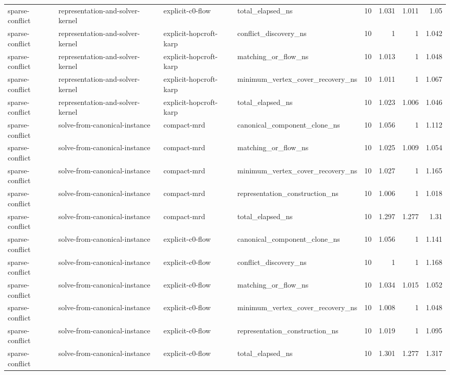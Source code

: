 \begin{table}[t]
\begin{tabular}{llllrrrr}
sparse-conflict & representation-and-solver-kernel & explicit-c0-flow & total\_elapsed\_ns & 10 & 1.031 & 1.011 & 1.05 \\
sparse-conflict & representation-and-solver-kernel & explicit-hopcroft-karp & conflict\_discovery\_ns & 10 & 1 & 1 & 1.042 \\
sparse-conflict & representation-and-solver-kernel & explicit-hopcroft-karp & matching\_or\_flow\_ns & 10 & 1.013 & 1 & 1.048 \\
sparse-conflict & representation-and-solver-kernel & explicit-hopcroft-karp & minimum\_vertex\_cover\_recovery\_ns & 10 & 1.011 & 1 & 1.067 \\
sparse-conflict & representation-and-solver-kernel & explicit-hopcroft-karp & total\_elapsed\_ns & 10 & 1.023 & 1.006 & 1.046 \\
sparse-conflict & solve-from-canonical-instance & compact-mrd & canonical\_component\_clone\_ns & 10 & 1.056 & 1 & 1.112 \\
sparse-conflict & solve-from-canonical-instance & compact-mrd & matching\_or\_flow\_ns & 10 & 1.025 & 1.009 & 1.054 \\
sparse-conflict & solve-from-canonical-instance & compact-mrd & minimum\_vertex\_cover\_recovery\_ns & 10 & 1.027 & 1 & 1.165 \\
sparse-conflict & solve-from-canonical-instance & compact-mrd & representation\_construction\_ns & 10 & 1.006 & 1 & 1.018 \\
sparse-conflict & solve-from-canonical-instance & compact-mrd & total\_elapsed\_ns & 10 & 1.297 & 1.277 & 1.31 \\
sparse-conflict & solve-from-canonical-instance & explicit-c0-flow & canonical\_component\_clone\_ns & 10 & 1.056 & 1 & 1.141 \\
sparse-conflict & solve-from-canonical-instance & explicit-c0-flow & conflict\_discovery\_ns & 10 & 1 & 1 & 1.168 \\
sparse-conflict & solve-from-canonical-instance & explicit-c0-flow & matching\_or\_flow\_ns & 10 & 1.034 & 1.015 & 1.052 \\
sparse-conflict & solve-from-canonical-instance & explicit-c0-flow & minimum\_vertex\_cover\_recovery\_ns & 10 & 1.008 & 1 & 1.048 \\
sparse-conflict & solve-from-canonical-instance & explicit-c0-flow & representation\_construction\_ns & 10 & 1.019 & 1 & 1.095 \\
sparse-conflict & solve-from-canonical-instance & explicit-c0-flow & total\_elapsed\_ns & 10 & 1.301 & 1.277 & 1.317 \\

\end{tabular}
\end{table}
